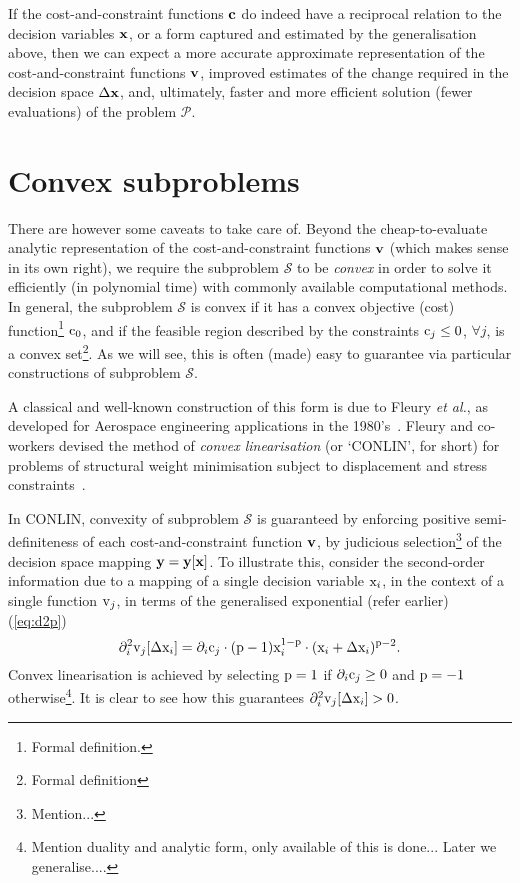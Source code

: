 \documentclass[11pt]{article}
\begin{document}
If the cost-and-constraint functions $\mathbf{c}$ do indeed have a reciprocal relation to the decision variables $\mathbf{x}$, or a form captured and estimated by the generalisation above, then we can expect a more accurate approximate representation of the cost-and-constraint functions $\mathbf{v}$, improved estimates of the change required in the decision space $\Delta \mathbf{x}$, and, ultimately, faster and more efficient solution (fewer evaluations) of the problem $\mathcal{P}$.

\section{Convex subproblems}

There are however some caveats to take care of. Beyond the cheap-to-evaluate analytic representation of the cost-and-constraint functions $\mathbf{v}$ (which makes sense in its own right), we require the subproblem $\mathcal{S}$ to be \emph{convex} in order to solve it efficiently (in polynomial time) with commonly available computational methods. In general, the subproblem $\mathcal{S}$ is convex if it has a convex objective (cost) function\footnote{Formal definition.} $\textrm{c}_0$, and if the feasible region described by the constraints $\textrm{c}_j \le 0$, $\forall j$, is a convex set\footnote{Formal definition}. As we will see, this is often (made) easy to guarantee via particular constructions of subproblem $\mathcal{S}$.

A classical and well-known construction of this form is due to Fleury \emph{et al.}, as developed for Aerospace engineering applications in the 1980's~\cite{fleury1986structural}. Fleury and co-workers devised the method of \emph{convex linearisation} (or `CONLIN', for short) for problems of structural weight minimisation subject to displacement and stress constraints~\cite{fleury1989conlin}. 

In CONLIN, convexity of subproblem $\mathcal{S}$ is guaranteed by enforcing positive semi-definiteness of each cost-and-constraint function $\mathbf{v}$, by judicious selection\footnote{Mention...} of the decision space mapping $\mathbf{y} = \mathbf{y}[\mathbf{x}]$. %
To illustrate this, consider the second-order information due to a mapping of a single decision variable $\textrm{x}_i$, in the context of a single function $\textrm{v}_j$, in terms of the generalised exponential (refer earlier) (\ref{eq:d2p})  
\begin{equation}
\partial_{i}^2 \textrm{v}_j[\Delta \textrm{x}_i] = \partial_i \textrm{c}_j \cdot (\textrm{p}-1)\textrm{x}_i^{1-\textrm{p}} \cdot (\textrm{x}_i +\Delta\textrm{x}_i)^{\textrm{p}-2} .
\end{equation}
Convex linearisation is achieved by selecting $\textrm{p}=1$ if $\partial_i \textrm{c}_j \ge 0$ and $\textrm{p}=-1$ otherwise\footnote{Mention duality and analytic form, only available of this is done... Later we generalise.... }. It is clear to see how this guarantees $\partial_{i}^2 \textrm{v}_j[\Delta \textrm{x}_i] > 0 $. 
\end{document}
